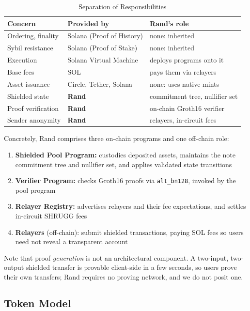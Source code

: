 \documentclass[11pt,a4paper]{article}
\begin{document}
\begin{table}[H]
\centering
\caption{Separation of Responsibilities}
\begin{tabular}{@{}lll@{}}
\toprule
\textbf{Concern} & \textbf{Provided by} & \textbf{Rand's role} \\ \midrule
Ordering, finality & Solana (Proof of History) & none: inherited \\
Sybil resistance & Solana (Proof of Stake) & none: inherited \\
Execution & Solana Virtual Machine & deploys programs onto it \\
Base fees & SOL & pays them via relayers \\
Asset issuance & Circle, Tether, Solana & none: uses native mints \\
Shielded state & \textbf{Rand} & commitment tree, nullifier set \\
Proof verification & \textbf{Rand} & on-chain Groth16 verifier \\
Sender anonymity & \textbf{Rand} & relayers, in-circuit fees \\ \bottomrule
\end{tabular}
\end{table}

Concretely, Rand comprises three on-chain programs and one off-chain role:

\begin{enumerate}
    \item \textbf{Shielded Pool Program:} custodies deposited assets, maintains the note commitment tree and nullifier set, and applies validated state transitions
    \item \textbf{Verifier Program:} checks Groth16 proofs via \texttt{alt\_bn128}, invoked by the pool program
    \item \textbf{Relayer Registry:} advertises relayers and their fee expectations, and settles in-circuit SHRUGG fees
    \item \textbf{Relayers} (off-chain): submit shielded transactions, paying SOL fees so users need not reveal a transparent account
\end{enumerate}

Note that proof \emph{generation} is not an architectural component. A two-input, two-output shielded transfer is provable client-side in a few seconds, so users prove their own transfers; Rand requires no proving network, and we do not posit one.

\subsection{Token Model}
\end{document}
